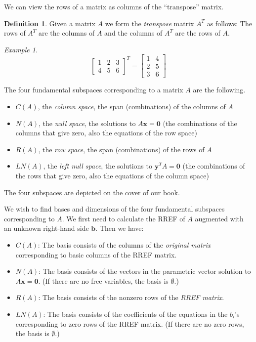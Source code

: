 \documentclass[11pt,oneside]{amsbook}
\theoremstyle{definition}
\theoremstyle{plain}
\theoremstyle{definition}
\newtheorem{definition}[theorem]{Definition}
\theoremstyle{remark}
\newtheorem{example}[theorem]{Example}
\numberwithin{equation}{section}
\numberwithin{figure}{section}
\begin{document}
We can view the rows of a matrix as columns of the ``transpose'' matrix.

\begin{definition}
  Given a matrix $A$ we form the \emph{transpose} matrix $A^T$ as follows: The rows of $A^T$ are the columns of $A$ and the columns of $A^T$ are the rows of $A$.
\end{definition}

\begin{example}
  \[\begin{bmatrix}1&2&3\\4&5&6\end{bmatrix}^T
    =\begin{bmatrix}1&4\\2&5\\3&6\end{bmatrix}
  \]
\end{example}

The four fundamental subspaces corresponding to a matrix $A$ are the following.
\begin{itemize}
  \item $C(A)$, the \emph{column space}, the span (combinations) of the columns of $A$
  \item $N(A)$, the \emph{null space}, the solutions to $A\bm{x}=\bm{0}$ (the combinations of the columns that give zero, also the equations of the row space)
  \item $R(A)$, the \emph{row space}, the span (combinations) of the rows of $A$
  \item $LN(A)$, the \emph{left null space}, the solutions to $\bm{y}^TA=\bm{0}$ (the combinations of the rows that give zero, also the equations of the column space)
\end{itemize}

The four subspaces are depicted on the cover of our book.

We wish to find bases and dimensions of the four fundamental subspaces corresponding to $A$. We first need to calculate the RREF of $A$ augmented with an unknown right-hand side $\bm{b}$. Then we have:

\begin{itemize}
  \item $C(A)$: The basis consists of the columns of the \emph{original matrix} corresponding to basic columns of the RREF matrix.
  \item $N(A)$: The basis consists of the vectors in the parametric vector solution to $A\bm{x}=\bm{0}$. (If there are no free variables, the basis is $\emptyset$.)
  \item $R(A)$: The basis consists of the nonzero rows of the \emph{RREF matrix}.
  \item $LN(A)$: The basis consists of the coefficients of the equations in the $b_i$'s corresponding to zero rows of the RREF matrix. (If there are no zero rows, the basis is $\emptyset$.)
\end{itemize}
\end{document}
